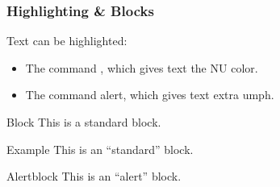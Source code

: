 \documentclass{beamer}
\begin{document}
\begin{frame}
  \frametitle{Highlighting \& Blocks}

  Text can be highlighted:
  \begin{itemize}
    \item The command , which gives text the NU color.
    \item The command \alert{alert}, which gives text extra umph.
  \end{itemize}

  \begin{block}{Block}
    This is a standard block.
  \end{block}

  \begin{example}{Example}
    This is an ``standard''  block.
  \end{example}

  \begin{alertblock}{Alertblock}
    This is an ``alert''  block.
  \end{alertblock}

\end{frame}

\hidelogo
\end{document}
